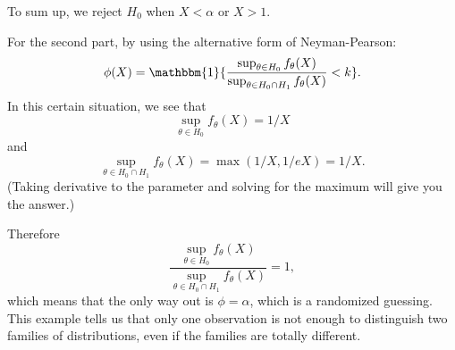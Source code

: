 \documentclass[12pt]{article}
\newcommand{\1}{\mathbbm{1}}
\begin{document}
To sum up, we reject $H_0$ when $X <\alpha$ or $X>1$.

For the second part, by using the alternative form of Neyman-Pearson:
$$
\phi(X) = \1 \{\frac{\sup_{\theta \in H_0} f_\theta(X) }{ \sup_{\theta \in H_0\cap H_1} f_\theta(X) }  < k\}.
$$
In this certain situation, we see that $$\sup_{\theta \in H_0} f_\theta(X) = 1/X$$
 and 
 $$
 \sup_{\theta \in H_0\cap H_1} f_\theta(X)  = \max(1/X, 1/eX) = 1/X . 
 $$ 
 (Taking derivative to the parameter and solving for the maximum will give you the answer.)
 
 Therefore $$\frac{\sup_{\theta \in H_0} f_\theta(X) }{ \sup_{\theta \in H_0\cap H_1} f_\theta(X) } = 1 ,$$
 which means that the only way out is $\phi = \alpha$, which is a randomized guessing. This example tells us that only one observation is not enough to distinguish two families of distributions, even if the families are totally different.

\end{document}
